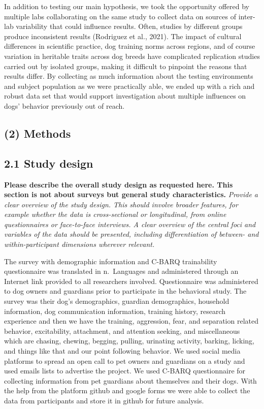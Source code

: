 \documentclass[
  pub,floatsintext]{apa6}
\begin{document}
In addition to testing our main hypothesis, we took the opportunity offered by multiple labs collaborating on the same study to collect data on sources of inter-lab variability that could influence results. Often, studies by different groups produce inconsistent results (Rodriguez et al., 2021). The impact of cultural differences in scientific practice, dog training norms across regions, and of course variation in heritable traits across dog breeds have complicated replication studies carried out by isolated groups, making it difficult to pinpoint the reasons that results differ. By collecting as much information about the testing environments and subject population as we were practically able, we ended up with a rich and robust data set that would support investigation about multiple influences on dogs' behavior previously out of reach.~

\hypertarget{methods}{%
\subsection{(2) Methods}\label{methods}}

\hypertarget{study-design}{%
\subsection{2.1 Study design}\label{study-design}}

\textbf{Please describe the overall study design as requested here. This section is not about surveys but general study characteristics.}
\emph{Provide a clear overview of the study design. This should involve broader features, for example whether the data is cross-sectional or longitudinal, from online questionnaires or face-to-face interviews. A clear overview of the central foci and variables of the data should be presented, including differentiation of between- and within-participant dimensions wherever relevant.}

The survey with demographic information and C-BARQ trainability questionnaire was translated in n.~Languages and administered through an Internet link provided to all researchers involved. Questionnaire was administered to dog owners and guardians prior to participate in the behavioral study. The survey was their dog's demographics, guardian demographics, household information, dog communication information, training history, research experience and then we have the training, aggression, fear, and separation related behavior, excitability, attachment, and attention seeking, and miscellaneous which are chasing, chewing, begging, pulling, urinating activity, barking, licking, and things like that and our point following behavior. We used social media platforms to spread an open call to pet owners and guardians on a study and used emails lists to advertise the project. We used C-BARQ questionnaire for collecting information from pet guardians about themselves and their dogs. With the help from the platform github and google forms we were able to collect the data from participants and store it in github for future analysis.
\end{document}
